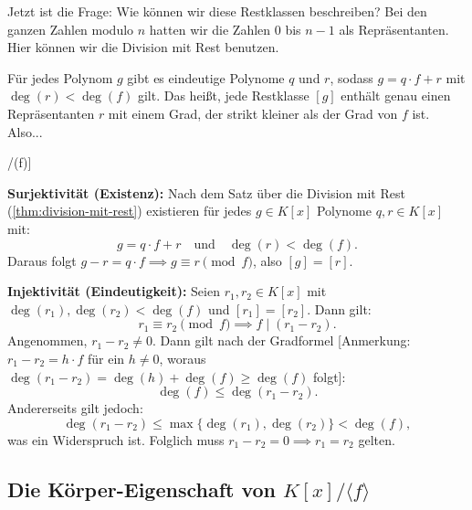 \begin{spoken-clean}[00:48:22 - 00:53:37]
Jetzt ist die Frage: Wie können wir diese Restklassen beschreiben? Bei den ganzen Zahlen modulo $n$ hatten wir die Zahlen $0$ bis $n-1$ als Repräsentanten. Hier können wir die Division mit Rest benutzen. 

Für jedes Polynom $g$ gibt es eindeutige Polynome $q$ und $r$, sodass $g = q \cdot f + r$ mit $\deg(r) < \deg(f)$ gilt. Das heißt, jede Restklasse $[g]$ enthält genau einen Repräsentanten $r$ mit einem Grad, der strikt kleiner als der Grad von $f$ ist. Also...
\end{spoken-clean}

\begin{math-stroke}[Repräsentantensystem für K[x]/(f)]

\begin{short-proof}
\textbf{Surjektivität (Existenz):} Nach dem Satz über die Division mit Rest (\cref{thm:division-mit-rest}) existieren für jedes $g \in K[x]$ Polynome $q, r \in K[x]$ mit:
\[
g = q \cdot f + r \quad \text{und} \quad \deg(r) < \deg(f).
\]
Daraus folgt $g - r = q \cdot f \implies g \equiv r \pmod f$, also $[g] = [r]$.

\textbf{Injektivität (Eindeutigkeit):} Seien $r_1, r_2 \in K[x]$ mit $\deg(r_1), \deg(r_2) < \deg(f)$ und $[r_1] = [r_2]$. Dann gilt:
\[
r_1 \equiv r_2 \pmod f \implies f \mid (r_1 - r_2).
\]
Angenommen, $r_1 - r_2 \neq 0$. Dann gilt nach der Gradformel [Anmerkung: $r_1 - r_2 = h \cdot f$ für ein $h \neq 0$, woraus $\deg(r_1 - r_2) = \deg(h) + \deg(f) \ge \deg(f)$ folgt]:
\[
\deg(f) \le \deg(r_1 - r_2).
\]
Andererseits gilt jedoch:
\[
\deg(r_1 - r_2) \le \max\{\deg(r_1), \deg(r_2)\} < \deg(f),
\]
was ein Widerspruch ist. Folglich muss $r_1 - r_2 = 0 \implies r_1 = r_2$ gelten.
\end{short-proof}
\end{math-stroke}

\subsection{Die Körper-Eigenschaft von \texorpdfstring{$K[x]/\langle f \rangle$}{K[x]/(f)}}

